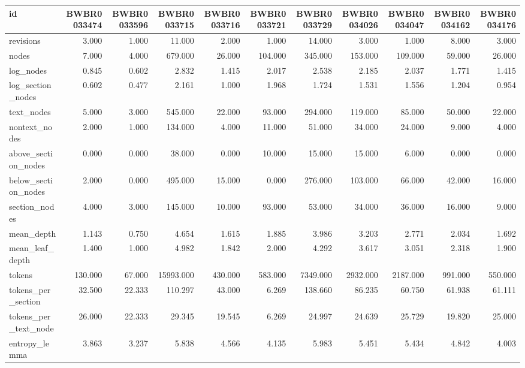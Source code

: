 \begin{tabular}{lrrrrrrrrrr}
\toprule
id & BWBR0033474 & BWBR0033596 & BWBR0033715 & BWBR0033716 & BWBR0033721 & BWBR0033729 & BWBR0034026 & BWBR0034047 & BWBR0034162 & BWBR0034176 \\
\midrule
revisions & 3.000 & 1.000 & 11.000 & 2.000 & 1.000 & 14.000 & 3.000 & 1.000 & 8.000 & 3.000 \\
\cline{1-11}
nodes & 7.000 & 4.000 & 679.000 & 26.000 & 104.000 & 345.000 & 153.000 & 109.000 & 59.000 & 26.000 \\
\cline{1-11}
log\_nodes & 0.845 & 0.602 & 2.832 & 1.415 & 2.017 & 2.538 & 2.185 & 2.037 & 1.771 & 1.415 \\
\cline{1-11}
log\_section\_nodes & 0.602 & 0.477 & 2.161 & 1.000 & 1.968 & 1.724 & 1.531 & 1.556 & 1.204 & 0.954 \\
\cline{1-11}
text\_nodes & 5.000 & 3.000 & 545.000 & 22.000 & 93.000 & 294.000 & 119.000 & 85.000 & 50.000 & 22.000 \\
\cline{1-11}
nontext\_nodes & 2.000 & 1.000 & 134.000 & 4.000 & 11.000 & 51.000 & 34.000 & 24.000 & 9.000 & 4.000 \\
\cline{1-11}
above\_section\_nodes & 0.000 & 0.000 & 38.000 & 0.000 & 10.000 & 15.000 & 15.000 & 6.000 & 0.000 & 0.000 \\
\cline{1-11}
below\_section\_nodes & 2.000 & 0.000 & 495.000 & 15.000 & 0.000 & 276.000 & 103.000 & 66.000 & 42.000 & 16.000 \\
\cline{1-11}
section\_nodes & 4.000 & 3.000 & 145.000 & 10.000 & 93.000 & 53.000 & 34.000 & 36.000 & 16.000 & 9.000 \\
\cline{1-11}
mean\_depth & 1.143 & 0.750 & 4.654 & 1.615 & 1.885 & 3.986 & 3.203 & 2.771 & 2.034 & 1.692 \\
\cline{1-11}
mean\_leaf\_depth & 1.400 & 1.000 & 4.982 & 1.842 & 2.000 & 4.292 & 3.617 & 3.051 & 2.318 & 1.900 \\
\cline{1-11}
tokens & 130.000 & 67.000 & 15993.000 & 430.000 & 583.000 & 7349.000 & 2932.000 & 2187.000 & 991.000 & 550.000 \\
\cline{1-11}
tokens\_per\_section & 32.500 & 22.333 & 110.297 & 43.000 & 6.269 & 138.660 & 86.235 & 60.750 & 61.938 & 61.111 \\
\cline{1-11}
tokens\_per\_text\_node & 26.000 & 22.333 & 29.345 & 19.545 & 6.269 & 24.997 & 24.639 & 25.729 & 19.820 & 25.000 \\
\cline{1-11}
entropy\_lemma & 3.863 & 3.237 & 5.838 & 4.566 & 4.135 & 5.983 & 5.451 & 5.434 & 4.842 & 4.003 \\

\end{tabular}
